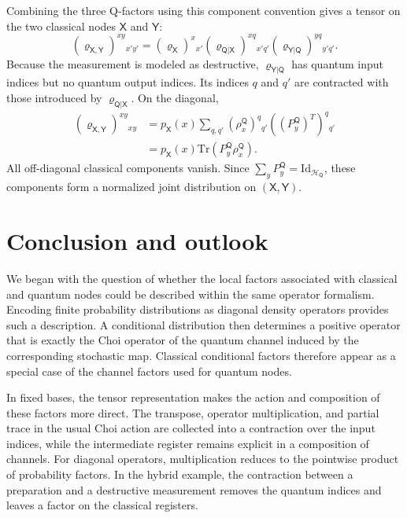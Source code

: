 \documentclass[
    aps,
    pra,
    reprint,
    superscriptaddress,
    nofootinbib
]{revtex4-2}
\theoremstyle{definition}
\theoremstyle{plain}
\begin{document}
Combining the three Q-factors using this component convention gives a
tensor on the two classical nodes $\mathsf{X}$ and $\mathsf{Y}$:
\begin{equation}
    (\varrho_{\mathsf{X},\mathsf{Y}})^{xy}{}_{x'y'}=
    (\varrho_{\mathsf{X}})^{x}{}_{x'}
    (\varrho_{\mathsf{Q}|\mathsf{X}})^{xq}{}_{x'q'}(\varrho_{\mathsf{Y}|\mathsf{Q}})^{yq}{}_{y'q'}.
\end{equation}
Because the measurement is modeled as destructive,
$\varrho_{\mathsf{Y}|\mathsf{Q}}$ has quantum input indices but no quantum
output indices. Its indices $q$ and $q'$ are contracted with those
introduced by $\varrho_{\mathsf{Q}|\mathsf{X}}$. On the diagonal,
\begin{equation}
    \begin{aligned}
    (\varrho_{\mathsf{X},\mathsf{Y}})^{xy}{}_{xy}
    &=
    p_{\mathsf{X}}(x)
    \sum_{q,q'}
    \left(\rho_x^{\mathsf{Q}}\right)^{q}{}_{q'}
    \left(\left(P_y^{\mathsf{Q}}\right)^{T}\right)^{q}{}_{q'}\\
    &=
    p_{\mathsf{X}}(x)
    \mathrm{Tr}\left(
        P_y^{\mathsf{Q}}\rho_x^{\mathsf{Q}}
    \right).
    \end{aligned}
\end{equation}
All off-diagonal classical components vanish. Since
$\sum_yP_y^{\mathsf{Q}}=\mathrm{Id}_{\mathcal{H}_{\mathsf{Q}}}$, these
components form a normalized joint distribution on
$(\mathsf{X},\mathsf{Y})$.

\section{Conclusion and outlook}

We began with the question of whether the local factors associated with
classical and quantum nodes could be described within the same operator
formalism. Encoding finite probability distributions as diagonal density
operators provides such a description. A conditional distribution then
determines a positive operator that is exactly the Choi operator of the
quantum channel induced by the corresponding stochastic map. Classical
conditional factors therefore appear as a special case of the channel
factors used for quantum nodes.

In fixed bases, the tensor representation makes the action and composition
of these factors more direct. The transpose, operator multiplication, and
partial trace in the usual Choi action are collected into a contraction over
the input indices, while the intermediate register remains explicit in a
composition of channels. For diagonal operators, multiplication reduces to
the pointwise product of probability factors. In the hybrid example, the
contraction between a preparation and a destructive measurement removes the
quantum indices and leaves a factor on the classical registers.
\end{document}
